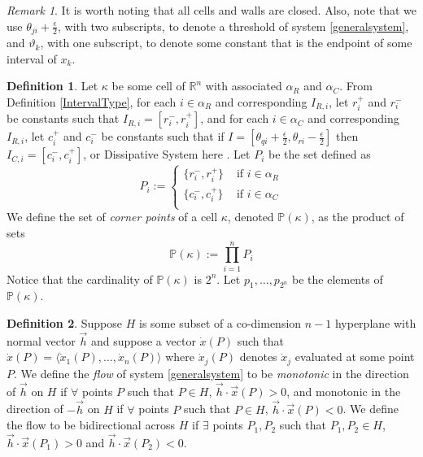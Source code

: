 \documentclass[12pt]{article}
\theoremstyle{definition}
\newtheorem{defn}{Definition}[section]
\theoremstyle{remark}
\newtheorem*{remark}{Remark}
\newcommand{\bbR}{\mathbb{R}} %
\newcommand{\bbP}{\mathbb{P}}
\begin{document}
\begin{remark}
It is worth noting that all cells and walls are closed. Also, note that we use $\theta_{ji}+\frac{\epsilon}{2}$, with two subscripts, to denote a threshold of system \eqref{generalsystem}, and $\vartheta_k$, with one subscript, to denote some constant that is the endpoint of some interval of $x_k$.
\end{remark}

\begin{defn}
Let $\kappa$ be some cell of $\bbR^n$ with associated $\alpha_R$ and $\alpha_C$. From Definition \ref{IntervalType}, for each $i\in\alpha_R$ and corresponding $I_{R,i}$, let $r_i^+$ and $r_i^-$ be constants such that $I_{R,i}=[r_i^-,r_i^+]$, and for each $i\in\alpha_C$ and corresponding $I_{R,i}$, let $c_i^+$ and $c_i^-$ be constants such that if $I=[\theta_{qi}+\frac{\epsilon}{2},\theta_{ri}-\frac{\epsilon}{2}]$ then $I_{C,i}=[c_i^-,c_i^+]$, or {\color{cyan} Dissipative System here} . Let $P_i$ be the set defined as 
\begin{equation*}
P_i :=
\begin{cases}
\{r_i^-,r_i^+\} &  \text{ if } i\in \alpha_R \\
\{c_i^-,c_i^+\} &  \text{ if } i\in \alpha_C \\
\end{cases}
\end{equation*}
We define the set of \textit{corner points} of a cell $\kappa$, denoted $\bbP(\kappa)$, as the product of sets 
\begin{equation*}
\bbP (\kappa) := \prod_{i=1}^n P_i
\end{equation*}
Notice that the cardinality of $\bbP (\kappa)$ is $2^n$. Let $p_1,\dots,p_{2^n}$ be the elements of $\bbP (\kappa)$.
\end{defn}

\begin{defn} \label{flowDefn}
Suppose $H$ is some subset of a co-dimension $n-1$ hyperplane with normal vector $\vec{h}$ and suppose a vector $\dot{x}(P)$ such that $\dot{x}(P)=\langle \dot{x}_1(P),\dots,\dot{x}_n(P) \rangle$ where $\dot{x}_j(P)$ denotes $\dot{x}_j$ evaluated at some point $P$. We define the \textit{flow} of system \eqref{generalsystem} to be \textit{monotonic} in the direction of $\vec{h}$ on $H$ if $\forall$ points $P$ such that $P\in H$, $\vec{h}\cdot\vec{x}(P)>0$, and monotonic in the direction of $-\vec{h}$ on $H$ if $\forall$ points $P$ such that $P\in H$, $\vec{h}\cdot\vec{x}(P)<0$. 
We define the flow to be bidirectional across $H$ if $\exists$ points $P_1,P_2$ such that $P_1,P_2 \in H$, $\vec{h}\cdot\vec{x}(P_1)>0$ and $\vec{h}\cdot\vec{x}(P_2)<0$.
\end{defn}
\end{document}
